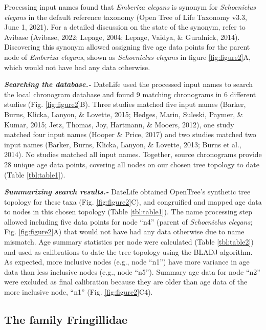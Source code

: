 \documentclass[
  english,
  man]{apa6}
\begin{document}
Processing input names found that \emph{Emberiza elegans} is synonym for \emph{Schoeniclus elegans} in the default reference taxonomy (Open Tree of Life Taxonomy v3.3, June 1, 2021). For a detailed discussion on the state of the synonym, refer to Avibase (Avibase, 2022; Lepage, 2004; Lepage, Vaidya, \& Guralnick, 2014).
Discovering this synonym allowed assigning five age data points for the parent node of \emph{Emberiza elegans}, shown as \emph{Schoeniclus elegans} in figure \ref{fig:figure2}A, which would not have had any data otherwise.

\emph{\textbf{Searching the database.-}}
DateLife used the processed input names to search the local chronogram database and found 9 matching chronograms in 6 different studies (Fig. \ref{fig:figure2}B). Three studies matched five input names (Barker, Burns, Klicka, Lanyon, \& Lovette, 2015; Hedges, Marin, Suleski, Paymer, \& Kumar, 2015; Jetz, Thomas, Joy, Hartmann, \& Mooers, 2012), one study matched four input names (Hooper \& Price, 2017) and two studies matched two input names (Barker, Burns, Klicka, Lanyon, \& Lovette, 2013; Burns et al., 2014). No studies matched all input names. Together, source chronograms provide 28 unique age data points, covering all nodes on our chosen tree topology to date (Table \ref{tbl:table1}).

\emph{\textbf{Summarizing search results.-}}
DateLife obtained OpenTree's synthetic tree topology for these taxa (Fig. \ref{fig:figure2}C), and congruified and mapped age data to nodes in this chosen topology (Table \ref{tbl:table1}).
The name processing step allowed including five data points for node ``n4'' (parent of \emph{Schoeniclus elegans}; Fig. \ref{fig:figure2}A) that would not have had any data otherwise due to name mismatch.
Age summary statistics per node were calculated (Table \ref{tbl:table2}) and used as calibrations to date the tree topology using the BLADJ algorithm.
As expected, more inclusive nodes (e.g., node ``n1'') have more variance in age data than less inclusive nodes (e.g., node ``n5'').
Summary age data for node ``n2'' were excluded as final calibration because they are older than age data of the more inclusive node, ``n1'' (Fig. \ref{fig:figure2}C4).

\hypertarget{the-family-fringillidae}{%
\subsection{The family Fringillidae}\label{the-family-fringillidae}}
\end{document}
